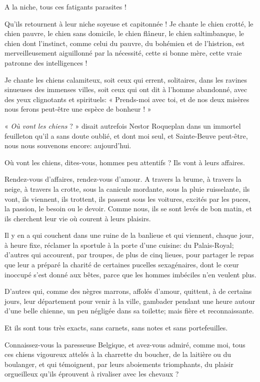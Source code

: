 A la niche, tous ces fatigants parasites !

Qu’ils retournent à leur niche soyeuse et capitonnée !
Je chante le chien crotté, le chien pauvre, le chien sans domicile, le
chien flâneur, le chien saltimbanque, le chien dont
l’instinct, comme celui du pauvre, du bohémien et de
l’histrion, est merveilleusement aiguillonné par la
nécessité, cette si bonne mère, cette vraie patronne des intelligences
!

Je chante les chiens calamiteux, soit ceux qui errent, solitaires, dans
les ravines sinueuses des immenses villes, soit ceux qui ont dit à
l’homme abandonné, avec des yeux clignotants et
spirituels: « Prends{}-moi avec toi, et de nos deux misères nous ferons
peut{}-être une espèce de bonheur ! »

« \textit{Où vont les chiens} ? » disait autrefois Nestor Roqueplan dans un
immortel feuilleton qu’il a sans doute oublié, et dont
moi seul, et Sainte{}-Beuve peut{}-être, nous nous souvenons encore:
aujourd’hui.

Où vont les chiens, dites{}-vous, hommes peu attentifs ? Ils vont à
leurs affaires.

Rendez{}-vous d’affaires, rendez{}-vous
d’amour. A travers la brume, à travers la neige, à
travers la crotte, sous la canicule mordante, sous la pluie
ruisselante, ils vont, ils viennent, ils trottent, ils passent sous les
voitures, excités par les puces, la passion, le besoin ou le devoir.
Comme nous, ils se sont levés de bon matin, et ils cherchent leur vie
où courent à leurs plaisirs.

Il y en a qui couchent dans une ruine de la banlieue et qui viennent,
chaque jour, à heure fixe, réclamer la sportule à la porte
d’une cuisine: du Palais{}-Royal;
d’autres qui accourent, par troupes, de plus de cinq
lieues, pour partager le repas que leur a préparé la charité de
certaines pucelles sexagénaires, dont le c\oe ur inoccupé
s’est donné aux bêtes, parce que les hommes imbéciles
n’en veulent plus.

D’autres qui, comme des nègres marrons, affolés
d’amour, quittent, à de certains jours, leur
département pour venir à la ville, gambader pendant une heure autour
d’une belle chienne, un peu négligée dans sa toilette;
mais fière et reconnaissante.

Et ils sont tous très exacts, sans carnets, sans notes et sans
portefeuilles.

Connaissez{}-vous la paresseuse Belgique, et avez{}-vous admiré, comme
moi, tous ces chiens vigoureux attelés à la charrette du boucher, de la
laitière ou du boulanger, et qui témoignent, par leurs aboiements
triomphants, du plaisir orgueilleux qu’ils éprouvent à
rivaliser avec les chevaux ?

